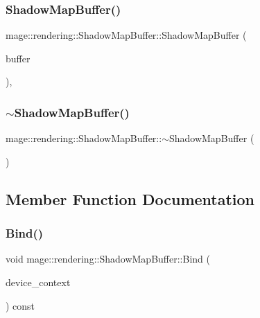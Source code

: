 \subsubsection{\texorpdfstring{Shadow\+Map\+Buffer()}{ShadowMapBuffer()}\hspace{0.1cm}{\footnotesize\ttfamily [3/3]}}
{\footnotesize\ttfamily mage\+::rendering\+::\+Shadow\+Map\+Buffer\+::\+Shadow\+Map\+Buffer (\begin{DoxyParamCaption}\item[{\hyperlink{classmage_1_1rendering_1_1_shadow_map_buffer}{Shadow\+Map\+Buffer} \&\&}]{buffer }\end{DoxyParamCaption})\hspace{0.3cm}{\ttfamily [default]}, {\ttfamily [noexcept]}}

\hypertarget{classmage_1_1rendering_1_1_shadow_map_buffer_afdce2b148b1ecca6a29db3f5019a8f7a}{}\label{classmage_1_1rendering_1_1_shadow_map_buffer_afdce2b148b1ecca6a29db3f5019a8f7a} 
\subsubsection{\texorpdfstring{$\sim$\+Shadow\+Map\+Buffer()}{~ShadowMapBuffer()}}
{\footnotesize\ttfamily mage\+::rendering\+::\+Shadow\+Map\+Buffer\+::$\sim$\+Shadow\+Map\+Buffer (\begin{DoxyParamCaption}{ }\end{DoxyParamCaption})\hspace{0.3cm}{\ttfamily [default]}}



\subsection{Member Function Documentation}
\hypertarget{classmage_1_1rendering_1_1_shadow_map_buffer_a59fccb2b8261a60c955f81e16d530cda}{}\label{classmage_1_1rendering_1_1_shadow_map_buffer_a59fccb2b8261a60c955f81e16d530cda} 
\subsubsection{\texorpdfstring{Bind()}{Bind()}}
{\footnotesize\ttfamily void mage\+::rendering\+::\+Shadow\+Map\+Buffer\+::\+Bind (\begin{DoxyParamCaption}\item[{I\+D3\+D11\+Device\+Context \&}]{device\+\_\+context }\end{DoxyParamCaption}) const\hspace{0.3cm}{\ttfamily [noexcept]}}

